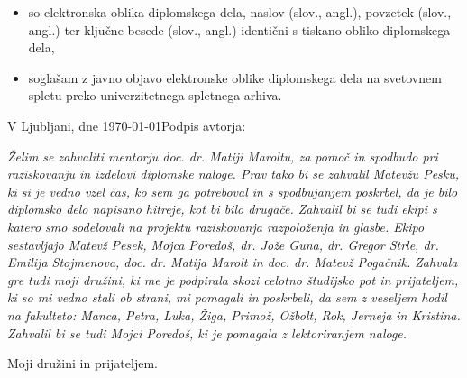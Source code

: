 \documentclass[a4paper, 12pt]{book}
\newcommand{\clearemptydoublepage}{\newpage{\pagestyle{empty}\cleardoublepage}}
\begin{document}
{\begin{itemize}
	\item	so elektronska oblika diplomskega dela, naslov (slov., angl.), povzetek (slov., angl.) ter ključne besede (slov., angl.) identični s tiskano obliko diplomskega dela,
	\item soglašam z javno objavo elektronske oblike diplomskega dela na svetovnem spletu preko univerzitetnega spletnega arhiva.	
\end{itemize}

\vspace{1cm}
\noindent V Ljubljani, dne \today \hfill Podpis avtorja:

\clearemptydoublepage

\thispagestyle{empty}\mbox{}\vfill\null\it%
Želim se zahvaliti mentorju doc. dr. Matiji Maroltu, za pomoč in spodbudo pri raziskovanju in izdelavi diplomske naloge. Prav tako bi se zahvalil Matevžu Pesku, ki si je vedno vzel čas, ko sem ga potreboval in s spodbujanjem poskrbel, da je bilo diplomsko delo napisano hitreje, kot bi bilo drugače. Zahvalil bi se tudi ekipi s katero smo sodelovali na projektu raziskovanja razpoloženja in glasbe. Ekipo sestavljajo Matevž Pesek, Mojca Poredoš, dr. Jože Guna, dr. Gregor Strle, dr. Emilija Stojmenova, doc. dr. Matija Marolt in doc. dr. Matevž Pogačnik. Zahvala gre tudi moji družini, ki me je podpirala skozi celotno študijsko pot in prijateljem, ki so mi vedno stali ob strani, mi pomagali in poskrbeli, da sem z veseljem hodil na fakulteto: Manca, Petra, Luka, Žiga, Primož, Ožbolt, Rok, Jerneja in Kristina. Zahvalil bi se tudi Mojci Poredoš, ki je pomagala z lektoriranjem naloge. 
\rm\normalfont

\clearemptydoublepage

\thispagestyle{empty}\mbox{}{\textheight}\mbox{}\hfill\begin{minipage}{0.55\textwidth}%
Moji družini in prijateljem.
\normalfont\end{minipage}

\clearemptydoublepage

\def\thepage{}%
\tableofcontents{}


\clearemptydoublepage


}
\end{document}
